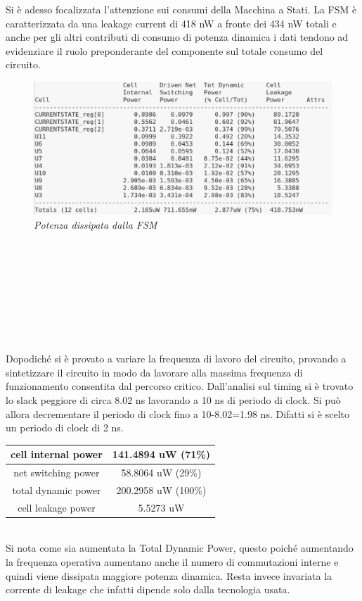 Si è adesso focalizzata l’attenzione sui consumi della Macchina a Stati. La FSM è caratterizzata da una leakage current di 418 nW a fronte dei 434 nW totali e anche per gli altri contributi di consumo di potenza dinamica i dati tendono ad evidenziare il ruolo preponderante del componente sul totale consumo del circuito. 
\\
\begin{figure}[!htb]
	\centering
	\includegraphics[scale=0.6]{immagini/fsm_power_cell}
	\caption{\textit{Potenza dissipata dalla FSM}}
	\label{datapath}
\end{figure} \\
\\
\\
\\
\\
\\
\\
\\
Dopodiché si è provato a variare la frequenza di lavoro del circuito, provando a sintetizzare il circuito in modo da lavorare alla massima frequenza di funzionamento consentita dal percorso critico. Dall’analisi sul timing si è trovato lo slack peggiore di circa 8.02 ns  lavorando a 10 ns di periodo di clock. Si può allora decrementare il periodo di clock fino a 10-8.02=1.98 ns. Difatti si è scelto un periodo di clock di 2 ns.
\\
\begin{table}[!h]\footnotesize
	\centering
	\begin{tabular}{|c|c|}
		\hline
		cell internal power & 141.4894 uW (71\%)\\
		\hline
		net switching power & 58.8064 uW (29\%)\\
		\hline
		\hline
		total dynamic power & 200.2958 uW (100\%)\\
		\hline
		cell leakage power & 5.5273 uW\\
		\hline
	\end{tabular}
\end{table} \\
 Si nota come sia aumentata la Total Dynamic Power, questo poiché aumentando la frequenza operativa aumentano anche il numero di commutazioni interne e quindi viene dissipata maggiore potenza dinamica. Resta invece invariata la corrente di leakage che infatti dipende solo dalla tecnologia usata.

